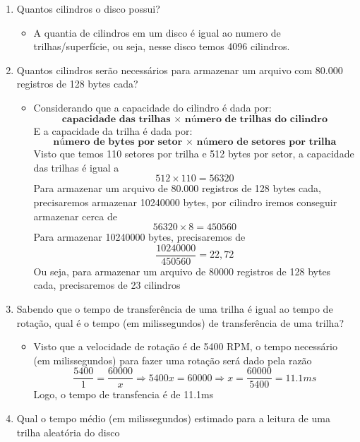 \documentclass[12pt]{article}
\begin{document}
\begin{enumerate}[label=\arabic*.]
    \item Quantos cilindros o disco possui?
    \begin{itemize}[label=R:]
        \item A quantia de cilindros em um disco é igual ao numero de 
        trilhas/superfície, ou seja, nesse disco temos 4096 cilindros.
    \end{itemize}
    \item Quantos cilindros serão necessários para armazenar um arquivo com 
    80.000 registros de 128 bytes cada?
    \begin{itemize}[label=R:]
        \item Considerando que a capacidade do cilindro é dada por:
        \[\textbf{capacidade das trilhas $\times$ número de trilhas do cilindro}\]
        E a capacidade da trilha é dada por:
        \[\textbf{número de bytes por setor $\times$ número de setores por 
        trilha}\]
        Visto que temos 110 setores por trilha e 512 bytes por setor, a 
        capacidade das trilhas é igual a \[512 \times 110 = 56320\]
        Para armazenar um arquivo de 80.000 registros de 128 bytes cada, 
        precisaremos armazenar 10240000 bytes, por cilindro iremos conseguir 
        armazenar cerca de \[56320 \times 8 = 450560\]
        Para armazenar 10240000 bytes, precisaremos de 
        \[\frac{10240000}{450560} = 22,72\]
        Ou seja, para armazenar um arquivo de 80000 registros de 128 bytes cada, 
        precisaremos de 23 cilindros
        
    \end{itemize}
    \item Sabendo que o tempo de transferência de uma trilha é igual ao tempo 
    de rotação, qual é o tempo (em milissegundos) de transferência de uma trilha?
    \begin{itemize}[label=R:]
        \item Visto que a velocidade de rotação é de 5400 RPM, o tempo necessário 
        (em milissegundos) para fazer uma rotação será dado pela razão 
        \[\frac{5400}{1}=\frac{60000}{x} \Rightarrow 5400x=60000 \Rightarrow 
        x=\frac{60000}{5400} = 11.1ms\]
        Logo, o tempo de transfencia é de 11.1ms
    \end{itemize}
    \item Qual o tempo médio (em milissegundos) estimado para a leitura de uma 
    trilha aleatória do disco
\end{enumerate}
\end{document}
